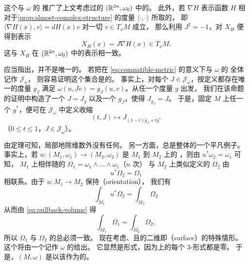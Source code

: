 这个与 $\omega$ \trCompatible{}的\trAlmostComplexStructure{}%
推广了上文考虑过的 $(\mathbb{R}^{2n},\omega_0)$ 中的\trComplexStructure。%
此外，若 $\nabla H$ 表示函数 $H$ 相对于\cref{prop:almost-complex-structure}%
的\trRiemann{}度量 $\langle\cdot,\cdot\rangle$ 所取的\trGradient，%
即 $\langle\nabla H(x),v\rangle=dH(x)v$ 对一切 $v\in T_xM$ 成立，%
那么利用 $J^{2}=-1$，对\trHamiltonianVectorField{} $X_H$ 便得到表示
\begin{equation}\label{eq:xh-representation-manifold}
X_H(x)=J\nabla H(x)\in T_xM.
\end{equation}
这与 $X_H$ 在 $(\mathbb{R}^{2n},\omega_0)$ 中的表示相一致。

应当指出，\trAlmostComplexStructure{}并不是唯一的。%
若把在 \eqref{eq:compatible-metric} 的意义下与 $\omega$ \trCompatible{}的%
\trAlmostComplexStructure{}全体记作 $\mathcal{J}_\omega$，%
则容易证明这个集合是\trContractible{}的。%
事实上，对每个 $J\in\mathcal{J}_\omega$，按定义都存在唯一的\trRiemann{}度量 $g_J$%
满足 $\omega(u,Jv)=g_J(u,v)$。从任一个\trRiemann{}度量 $g$ 出发，%
我们在该命题的证明中构造了一个\trAlmostComplexStructure{} $J=J_g$%
以及一个\trMetric{} $g_J$，使得 $J_{g_J}=J$。%
于是，固定 $M$ 上任一个\trMetric{} $g^{*}$，便可在 $\mathcal{J}_\omega$ 中定义收缩
\[
(t,J)\mapsto J_{(1-t)g_J+tg^{*}}
\]
（$0\le t\le1$，$J\in\mathcal{J}_\omega$）。

由\trDarboux{}定理可知，局部地除维数外没有任何\trSymplecticInvariant。%
另一方面，总\trVolume{}是整体\trSymplecticInvariant{}的一个平凡例子。%
事实上，若 $u:(M_1,\omega_1)\to(M_2,\omega_2)$ 是 $M_1$ 到 $M_2$ 上的%
\trSymplecticDiffeomorphism，则由 $u^{*}\omega_2=\omega_1$ 可知，%
$M_1$ 上相伴随的\trVolumeForm{} $\Omega_1=\omega_1\wedge\dots\wedge\omega_1$（$n$ 次）%
与 $M_2$ 上类似定义的 $\Omega_2$ 由
\begin{equation}\label{eq:pullback-volume}
u^{*}\Omega_2=\Omega_1
\end{equation}
相联系。由于\trDiffeomorphism{} $u:M_1\to M_2$ 保持\textbf{\trOrientation}（orientation），%
我们有
\[
\int_{M_1}u^{*}\Omega_2=\int_{M_2}\Omega_2
\]
从而由 \eqref{eq:pullback-volume} 得
\[
\int_{M_1}\Omega_1=\int_{M_2}\Omega_2,
\]
所以 $\Omega_1$ 与 $\Omega_2$ 的总\trVolume{}必须一致。%
现在考虑\trCompact、\trConnected{}且\trOriented{}的二维\trManifold{}即\textbf{\trSurface}（surface）的特殊情形。%
这个\trOrientation{}将由一个记作 $\omega$ 的\trVolumeForm{}给出。%
它显然是\trClosed{}形式，因为\trSurface{}上的每个 $3$-形式都是零。%
于是，$(M,\omega)$ 是以该\trVolumeForm{}作为\trSymplecticStructure{}的\trSymplecticManifold。

